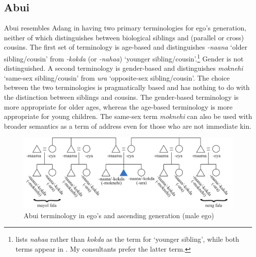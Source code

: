 \subsection{Abui}\label{sect_abui}
Abui resembles Adang in having two primary terminologies for ego's generation, neither of which distinguishes between biological siblings and (parallel or cross) cousins. The first set of terminology is age-based and distinguishes \textit{-naana} `older sibling/cousin' from \textit{-kokda} (or \textit{-nahaa}) `younger sibling/cousin'.\footnote{{ }  \citet[56]{Nicolspeyer1940} lists \textit{nahaa} rather than \textit{kokda} as the term for `younger sibling', while both terms appear in \citet{KratochvilEtAl2008}. My consultants prefer the latter term.}  Gender is not distinguished. A second terminology is gender-based and distinguishes \textit{moknehi} `same-sex sibling/cousin' from \textit{ura} `opposite-sex sibling/cousin'. The choice between the two terminologies is pragmatically based and has nothing to do with the distinction between siblings and cousins. The gender-based terminology is more appropriate for older ages, whereas the age-based terminology is more appropriate for young children. The same-sex term \textit{moknehi} can also be used with broader semantics as a term of address even for those who are not immediate kin.

\begin{figure}
\includegraphics[width=\textwidth]{figures/Holton_ch5_fig10.pdf}
\caption{Abui terminology in ego's and ascending generation (male ego) }
\end{figure}  

